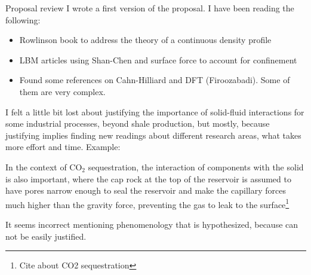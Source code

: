 \documentclass[8pt]{beamer}
\begin{document}
	
	\begin{frame}[t]{Proposal review}
		I wrote a first version of the proposal. I have been reading the following:
		\begin{itemize}
			\item Rowlinson book to address the theory of a continuous density profile
			\item LBM articles using Shan-Chen and surface force to account for confinement
			\item Found some references on Cahn-Hilliard and DFT (Firoozabadi). Some of them are very complex.
		\end{itemize}
		
		I felt a little bit lost about justifying the importance of solid-fluid interactions for some industrial processes, beyond shale production, but mostly, because justifying implies finding new readings about different research areas, what takes more effort and time. Example:
		
		\begin{examples}
			In the context of CO$_2$ sequestration, the interaction of components with the solid is also important, where the cap rock at the top of the reservoir is assumed to have pores narrow enough to seal the reservoir and make the capillary forces much higher than the gravity force, preventing the gas to leak to the surface\footnote{Cite about CO2 sequestration}
		\end{examples}
		
		It seems incorrect mentioning phenomenology that is hypothesized, because can not be easily justified.
	\end{frame}
	
\end{document}
